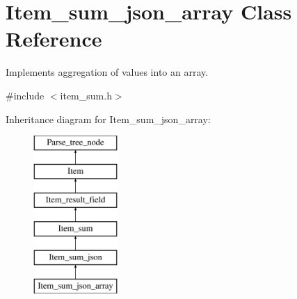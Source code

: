 \hypertarget{classItem__sum__json__array}{}\section{Item\+\_\+sum\+\_\+json\+\_\+array Class Reference}
\label{classItem__sum__json__array}


Implements aggregation of values into an array.  




{\ttfamily \#include $<$item\+\_\+sum.\+h$>$}

Inheritance diagram for Item\+\_\+sum\+\_\+json\+\_\+array\+:\begin{figure}[H]
\begin{center}
\leavevmode
\includegraphics[height=6.000000cm]{classItem__sum__json__array}
\end{center}
\end{figure}
